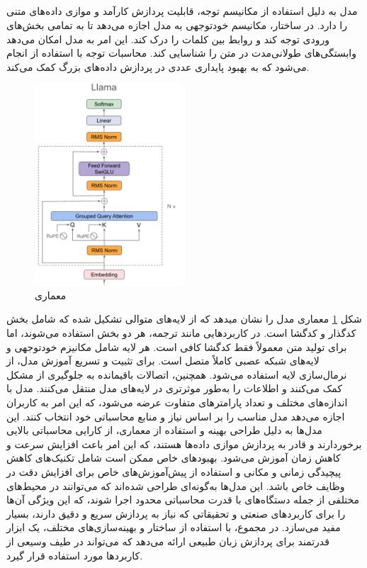\subsection{}
مدل  به دلیل استفاده از مکانیسم توجه، قابلیت پردازش کارآمد و موازی داده‌های متنی را دارد. در ساختار، مکانیسم خودتوجهی به مدل اجازه می‌دهد تا به تمامی بخش‌های ورودی توجه کند و روابط بین کلمات را درک کند. این امر به مدل امکان می‌دهد وابستگی‌های طولانی‌مدت در متن را شناسایی کند. محاسبات توجه با استفاده از انجام می‌شود که به بهبود پایداری عددی در پردازش داده‌های بزرگ کمک می‌کند.
\begin{figure}[H]
	\centering
	\includegraphics[width=0.5\textwidth]{figures/LLaMA.png}
	\caption{معماری }
	\label{fig:LLaMA}
\end{figure}
شکل \ref{fig:LLaMA} معماری مدل  را نشان میدهد که از لایه‌های متوالی تشکیل شده که شامل بخش کدگذار و کدگشا است. در کاربردهایی مانند ترجمه، هر دو بخش استفاده می‌شوند، اما برای تولید متن معمولاً فقط کدگشا کافی است. هر لایه شامل مکانیزم خودتوجهی و لایه‌های شبکه عصبی کاملاً متصل است. برای تثبیت و تسریع آموزش مدل، از نرمال‌سازی لایه استفاده می‌شود. همچنین، اتصالات باقیمانده به جلوگیری از مشکل کمک می‌کنند و اطلاعات را به‌طور موثرتری در لایه‌های مدل منتقل می‌کنند.
مدل  با اندازه‌های مختلف و تعداد پارامترهای متفاوت عرضه می‌شود، که این امر به کاربران اجازه می‌دهد مدل مناسب را بر اساس نیاز و منابع محاسباتی خود انتخاب کنند. این مدل‌ها به دلیل طراحی بهینه و استفاده از معماری، از کارایی محاسباتی بالایی برخوردارند و قادر به پردازش موازی داده‌ها هستند، که این امر باعث افزایش سرعت و کاهش زمان آموزش می‌شود.
بهبودهای خاص  ممکن است شامل تکنیک‌های کاهش پیچیدگی زمانی و مکانی و استفاده از پیش‌آموزش‌های خاص برای افزایش دقت در وظایف خاص باشد. این مدل‌ها به‌گونه‌ای طراحی شده‌اند که می‌توانند در محیط‌های مختلفی از جمله دستگاه‌های با قدرت محاسباتی محدود اجرا شوند، که این ویژگی آن‌ها را برای کاربردهای صنعتی و تحقیقاتی که نیاز به پردازش سریع و دقیق دارند، بسیار مفید می‌سازد.
در مجموع،  با استفاده از ساختار و بهینه‌سازی‌های مختلف، یک ابزار قدرتمند برای پردازش زبان طبیعی ارائه می‌دهد که می‌تواند در طیف وسیعی از کاربردها مورد استفاده قرار گیرد.

